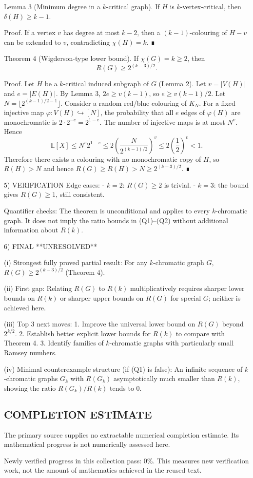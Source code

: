 Lemma 3 (Minimum degree in a $k$-critical graph).
If $H$ is $k$-vertex-critical, then $\delta(H)\ge k-1$.

Proof.
If a vertex $v$ has degree at most $k-2$, then a $(k-1)$-colouring of $H-v$ can be extended to $v$,
contradicting $\chi(H)=k$. ∎

Theorem 4 (Wigderson-type lower bound).
If $\chi(G)=k\ge 2$, then
\[R(G)\ge 2^{(k-3)/2}.\]

Proof.
Let $H$ be a $k$-critical induced subgraph of $G$ (Lemma 2). Let $v=|V(H)|$ and $e=|E(H)|$.
By Lemma 3, $2e\ge v(k-1)$, so $e\ge v(k-1)/2$.
Let $N=\lfloor 2^{(k-1)/2-1}\rfloor$. Consider a random red/blue colouring of $K_N$.
For a fixed injective map $\varphi:V(H)\hookrightarrow [N]$, the probability that all $e$ edges of
$\varphi(H)$ are monochromatic is $2\cdot 2^{-e}=2^{1-e}$. The number of injective maps is at most
$N^v$. Hence
\[\mathbb{E}[X]\le N^v 2^{1-e}\le 2\left(\frac{N}{2^{(k-1)/2}}\right)^v\le 2\left(\frac12\right)^v<1.
\]
Therefore there exists a colouring with no monochromatic copy of $H$, so $R(H)>N$ and hence
$R(G)\ge R(H)>N\ge 2^{(k-3)/2}$. ∎

5) VERIFICATION
Edge cases:
- $k=2$: $R(G)\ge 2$ is trivial.
- $k=3$: the bound gives $R(G)\ge 1$, still consistent.

Quantifier checks:
The theorem is unconditional and applies to every $k$-chromatic graph. It does not imply the
ratio bounds in (Q1)--(Q2) without additional information about $R(k)$.

6) FINAL
**UNRESOLVED**

(i) Strongest fully proved partial result:
For any $k$-chromatic graph $G$, $R(G)\ge 2^{(k-3)/2}$ (Theorem 4).

(ii) First gap:
Relating $R(G)$ to $R(k)$ multiplicatively requires sharper lower bounds on $R(k)$ or sharper
upper bounds on $R(G)$ for special $G$; neither is achieved here.

(iii) Top 3 next moves:
1. Improve the universal lower bound on $R(G)$ beyond $2^{k/2}$.
2. Establish better explicit lower bounds for $R(k)$ to compare with Theorem 4.
3. Identify families of $k$-chromatic graphs with particularly small Ramsey numbers.

(iv) Minimal counterexample structure (if (Q1) is false):
An infinite sequence of $k$-chromatic graphs $G_k$ with $R(G_k)$ asymptotically much smaller than
$R(k)$, showing the ratio $R(G_k)/R(k)$ tends to $0$.


\subsection*{COMPLETION ESTIMATE}
The primary source supplies no extractable numerical completion estimate. Its mathematical progress is not numerically assessed here.

Newly verified progress in this collection pass: $0\%$. This measures new verification work, not the amount of mathematics achieved in the reused text.
